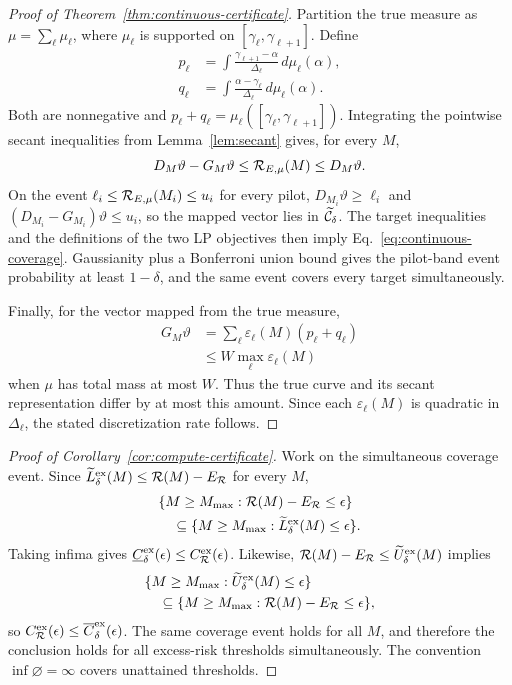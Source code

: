 \begin{proof}[Proof of Theorem~\ref{thm:continuous-certificate}]
Partition the true measure as $\mu=\sum_\ell\mu_\ell$, where $\mu_\ell$ is supported on
$[\gamma_\ell,\gamma_{\ell+1}]$. Define
\begin{align*}
p_\ell&=\int\frac{\gamma_{\ell+1}-\alpha}{\Delta_\ell}\,d\mu_\ell(\alpha),\\
q_\ell&=\int\frac{\alpha-\gamma_\ell}{\Delta_\ell}\,d\mu_\ell(\alpha).
\end{align*}
Both are nonnegative and $p_\ell+q_\ell=\mu_\ell([\gamma_\ell,\gamma_{\ell+1}])$. Integrating the pointwise secant inequalities from Lemma~\ref{lem:secant} gives, for every $M$,
\[
D_M\vartheta-G_M\vartheta
\le \mathcal{R}_{E,\mu}(M)\le D_M\vartheta.
\]
On the event $\ell_i\le\mathcal{R}_{E,\mu}(M_i)\le u_i$ for every pilot,
$D_{M_i}\vartheta\ge\ell_i$ and
$(D_{M_i}-G_{M_i})\vartheta\le u_i$, so the mapped vector lies in
$\widetilde{\mathcal{C}}_\delta$. The target inequalities and the definitions of the two LP objectives then imply Eq.~\eqref{eq:continuous-coverage}. Gaussianity plus a Bonferroni union bound gives the pilot-band event probability at least $1-\delta$, and the same event covers every target simultaneously.

Finally, for the vector mapped from the true measure,
\begin{align*}
G_M\vartheta
&=\sum_\ell\varepsilon_\ell(M)(p_\ell+q_\ell)\\
&\le W\max_\ell\varepsilon_\ell(M)
\end{align*}
when $\mu$ has total mass at most $W$. Thus the true curve and its secant representation differ by at most this amount. Since each $\varepsilon_\ell(M)$ is quadratic in $\Delta_\ell$, the stated discretization rate follows.
\end{proof}

\begin{proof}[Proof of Corollary~\ref{cor:compute-certificate}]
Work on the simultaneous coverage event. Since
$\widetilde L^{\mathrm{ex}}_\delta(M)
\le\mathcal{R}(M)-E_{\mathcal{R}}$ for every $M$,
\begin{align*}
 &\{M\ge M_{\max}:\mathcal{R}(M)-E_{\mathcal{R}}\le\epsilon\}\\
 &\quad\subseteq
 \{M\ge M_{\max}:
 \widetilde L^{\mathrm{ex}}_\delta(M)\le\epsilon\}.
\end{align*}
Taking infima gives
$\underline C^{\mathrm{ex}}_\delta(\epsilon)
\le C^{\mathrm{ex}}_{\mathcal{R}}(\epsilon)$.
Likewise,
$\mathcal{R}(M)-E_{\mathcal{R}}
\le\widetilde U^{\mathrm{ex}}_\delta(M)$ implies
\begin{align*}
 &\{M\ge M_{\max}:
 \widetilde U^{\mathrm{ex}}_\delta(M)\le\epsilon\}\\
 &\quad\subseteq
 \{M\ge M_{\max}:\mathcal{R}(M)-E_{\mathcal{R}}\le\epsilon\},
\end{align*}
so
$C^{\mathrm{ex}}_{\mathcal{R}}(\epsilon)
\le\overline C^{\mathrm{ex}}_\delta(\epsilon)$.
The same coverage event holds for all $M$, and therefore the conclusion holds for all excess-risk thresholds simultaneously. The convention $\inf\varnothing=\infty$ covers unattained thresholds.
\end{proof}

